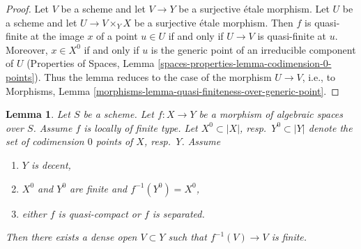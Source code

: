 \documentclass{stacks-project}
\theoremstyle{plain}
\newtheorem{lemma}[subsection]{Lemma}
\theoremstyle{definition}
\theoremstyle{remark}
\numberwithin{equation}{subsection}
\begin{document}
\begin{proof}
Let $V$ be a scheme and let $V \to Y$ be a surjective \'etale morphism.
Let $U$ be a scheme and let $U \to V \times_Y X$ be a surjective \'etale
morphism. Then $f$ is quasi-finite at the image $x$ of a point $u \in U$
if and only if $U \to V$ is quasi-finite at $u$. Moreover, $x \in X^0$
if and only if $u$ is the generic point of an irreducible component
of $U$ (Properties of Spaces, Lemma
\ref{spaces-properties-lemma-codimension-0-points}).
Thus the lemma reduces to the case of the morphism $U \to V$, i.e., to
Morphisms, Lemma \ref{morphisms-lemma-quasi-finiteness-over-generic-point}.
\end{proof}

\begin{lemma}
\label{lemma-finite-over-dense-open}
Let $S$ be a scheme. Let $f : X \to Y$ be a morphism of algebraic spaces
over $S$. Assume $f$ is locally of finite type.
Let $X^0 \subset |X|$, resp.\ $Y^0 \subset |Y|$ denote the set of
codimension $0$ points of $X$, resp.\ $Y$. Assume
\begin{enumerate}
\item $Y$ is decent,
\item $X^0$ and $Y^0$ are finite and $f^{-1}(Y^0) = X^0$,
\item either $f$ is quasi-compact or $f$ is separated.
\end{enumerate}
Then there exists a dense open $V \subset Y$
such that $f^{-1}(V) \to V$ is finite.
\end{lemma}
\end{document}
